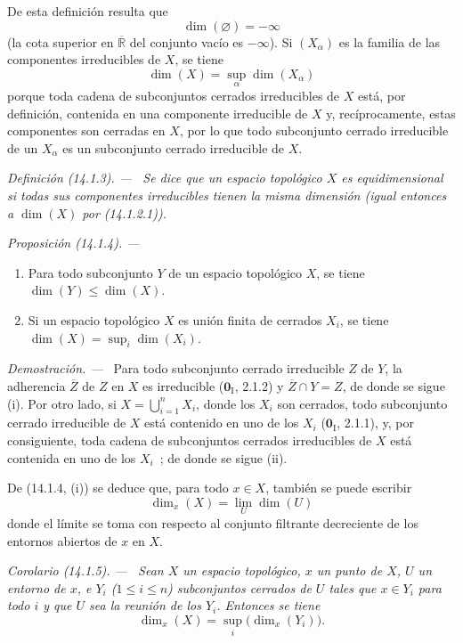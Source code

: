 \documentclass[10pt,oneside]{book}
\makeatletter
\newcommand{\setmanualcurrentlabel}[1]{\def\@currentlabel{#1}}
\newcommand{\oldpage}[2][]{%
  \setcounter{footnote}{0}%
  \marginpar{\scriptsize\textbf{#1}~|~#2}\ignorespaces}
\newenvironment{definition}[1][]{%
  \setmanualcurrentlabel{#1}\par\medskip\noindent\itshape Definición (#1). ---\ }{\par}
\newenvironment{proposition}[1][]{%
  \setmanualcurrentlabel{#1}\par\medskip\noindent\itshape Proposición (#1). ---\ }{\par}
\newenvironment{corollary}[1][]{%
  \setmanualcurrentlabel{#1}\par\medskip\noindent\itshape Corolario (#1). ---\ }{\par}
\newenvironment{proof}{%
  \par\medskip\noindent\textit{Demostración. ---\ }}{\par}
\makeatother
\begin{document}
De esta definición resulta que
\[
  \dim(\varnothing)=-\infty
\]
(la cota superior en $\overline{\mathbb R}$ del conjunto vacío es $-\infty$).
Si $(X_\alpha)$ es la familia de las componentes irreducibles de $X$, se tiene
\[
  \dim(X)=\sup_\alpha\dim(X_\alpha)
  \tag{14.1.2.1}\label{0.14.1.2.1-es}
\]
porque toda cadena de subconjuntos cerrados irreducibles de $X$ está, por
definición, contenida en una componente irreducible de $X$ y, recíprocamente,
estas componentes son cerradas en $X$, por lo que todo subconjunto cerrado
irreducible de un $X_\alpha$ es un subconjunto cerrado irreducible de $X$.

\begin{definition}[14.1.3]
\label{0.14.1.3-es}
Se dice que un espacio topológico $X$ es equidimensional si todas sus
componentes irreducibles tienen la misma dimensión \textup{(igual entonces a $\dim(X)$
por (14.1.2.1))}.
\end{definition}

\begin{proposition}[14.1.4]
\label{0.14.1.4-es}
\begin{enumerate}
  \item[\rm(i)] Para todo subconjunto $Y$ de un espacio topológico $X$, se tiene
  $\dim(Y)\leq\dim(X)$.
  \item[\rm(ii)] Si un espacio topológico $X$ es unión finita de cerrados
  $X_i$, se tiene $\dim(X)=\sup_i\dim(X_i)$.
\end{enumerate}
\end{proposition}

\begin{proof}
Para todo subconjunto cerrado irreducible $Z$ de $Y$, la adherencia $\overline Z$
de $Z$ en $X$ es irreducible ($\mathbf{0}_{\mathrm I}$, 2.1.2) y
$\overline Z\cap Y=Z$, de donde se sigue (i). Por otro lado, si
$X=\bigcup_{i=1}^n X_i$, donde los $X_i$ son cerrados, todo subconjunto cerrado
irreducible de $X$ está contenido en uno de los $X_i$ ($\mathbf{0}_{\mathrm I}$, 2.1.1),
y, por consiguiente, toda cadena de subconjuntos cerrados irreducibles de $X$
está contenida en uno de los $X_i$~; de donde se sigue (ii).
\end{proof}

De (14.1.4, (i)) se deduce que, para todo $x\in X$, también se puede escribir
\[
  \dim_x(X)=\lim_U\dim(U)
  \tag{14.1.4.1}\label{0.14.1.4.1-es}
\]
donde el límite se toma con respecto al conjunto filtrante decreciente de los
entornos abiertos de $x$ en $X$.

\oldpage[0\textsubscript{IV-1}]{7}
\begin{corollary}[14.1.5]
\label{0.14.1.5-es}
Sean $X$ un espacio topológico, $x$ un punto de $X$, $U$ un entorno de
$x$, e $Y_i$ \textup{($1\leq i\leq n$)} subconjuntos cerrados de $U$ tales que
$x\in Y_i$ para todo $i$ y que $U$ sea la reunión de los $Y_i$. Entonces se tiene
\[
  \dim_x(X)=\sup_i\bigl(\dim_x(Y_i)\bigr).
  \tag{14.1.5.1}\label{0.14.1.5.1-es}
\]
\end{corollary}
\end{document}
